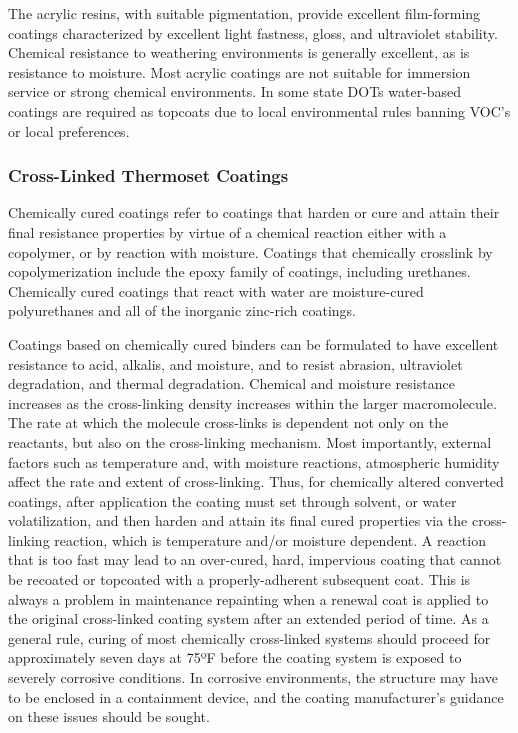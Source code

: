 The acrylic resins, with suitable pigmentation, provide excellent film-forming coatings characterized by excellent
light fastness, gloss, and ultraviolet stability. Chemical resistance to weathering environments is generally excellent,
as is resistance to moisture. Most acrylic coatings are not suitable for immersion service or strong chemical
environments. In some state DOTs water-based coatings are required as topcoats due to local environmental rules
banning VOC’s or local preferences.

\subsubsection{Cross-Linked Thermoset Coatings}
Chemically cured coatings refer to coatings that harden or cure and attain their final resistance properties by
virtue of a chemical reaction either with a copolymer, or by reaction with moisture. Coatings that chemically crosslink
by copolymerization include the epoxy family of coatings, including urethanes. Chemically cured coatings that
react with water are moisture-cured polyurethanes and all of the inorganic zinc-rich coatings.

Coatings based on chemically cured binders can be formulated to have excellent resistance to acid, alkalis, and
moisture, and to resist abrasion, ultraviolet degradation, and thermal degradation. Chemical and moisture resistance
increases as the cross-linking density increases within the larger macromolecule. The rate at which the molecule
cross-links is dependent not only on the reactants, but also on the cross-linking mechanism. Most importantly,
external factors such as temperature and, with moisture reactions, atmospheric humidity affect the rate and extent of
cross-linking. Thus, for chemically altered converted coatings, after application the coating must set through solvent,
or water volatilization, and then harden and attain its final cured properties via the cross-linking reaction, which is
temperature and/or moisture dependent. A reaction that is too fast may lead to an over-cured, hard, impervious
coating that cannot be recoated or topcoated with a properly-adherent subsequent coat. This is always a problem in
maintenance repainting when a renewal coat is applied to the original cross-linked coating system after an extended
period of time. As a general rule, curing of most chemically cross-linked systems should proceed for approximately
seven days at 75ºF before the coating system is exposed to severely corrosive conditions. In corrosive environments,
the structure may have to be enclosed in a containment device, and the coating manufacturer’s guidance on these
issues should be sought.

